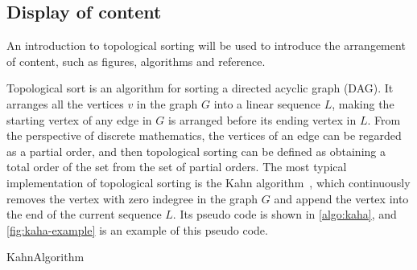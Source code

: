 \subsection{Display of content}

An introduction to topological sorting will be used to introduce the arrangement of content, such as figures, algorithms and reference.

Topological sort is an algorithm for sorting a directed acyclic graph (DAG).
It arranges all the vertices $v$ in the graph $G$ into a linear sequence $L$, making the starting vertex of any edge in $G$ is arranged before its ending vertex in $L$.
From the perspective of discrete mathematics, the vertices of an edge can be regarded as a partial order, and then topological sorting can be defined as obtaining a total order of the set from the set of partial orders.
The most typical implementation of topological sorting is the Kahn algorithm~\cite{kahn1962topological}, which continuously removes the vertex with zero indegree in the graph $G$ and append the vertex into the end of the current sequence $L$.
Its pseudo code is shown in \autoref{algo:kaha}, and \autoref{fig:kaha-example} is an example of this pseudo code.

  \begin{algorithm}[H]
    \caption{KahnAlgorithm}
    \label{algo:kaha}
    
  \end{algorithm}

